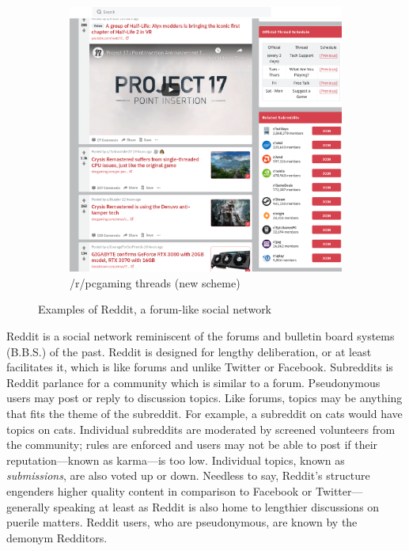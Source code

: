 \documentclass[12pt, a4paper]{article}
\begin{document}
\begin{figure}[ht!]
\begin{subfigure}[b]{0.4\linewidth}
    \includegraphics[width=\linewidth]{reddit_pcgaming.png}
    \caption{/r/pcgaming threads (new scheme)}
  \end{subfigure}
  \label{fig:redditexamples}
  \caption{Examples of Reddit, a forum-like social network}
\end{figure}
Reddit is a social network reminiscent of the forums and bulletin board systems (B.B.S.) of the past. Reddit is designed for lengthy deliberation, or at least facilitates it, which is like forums and unlike Twitter or Facebook. Subreddits is Reddit parlance for a community which is similar to a forum. Pseudonymous users may post or reply to discussion topics. Like forums, topics may be anything that fits the theme of the subreddit. For example, a subreddit on cats would have topics on cats. Individual subreddits are moderated by screened volunteers from the community; rules are enforced and users may not be able to post if their reputation---known as karma---is too low. Individual topics, known as \textit{submissions}, are also voted up or down. Needless to say, Reddit's structure engenders higher quality content in comparison to Facebook or Twitter---generally speaking at least as Reddit is also home to lengthier discussions on puerile matters. Reddit users, who are pseudonymous, are known by the demonym Redditors.
\end{document}
